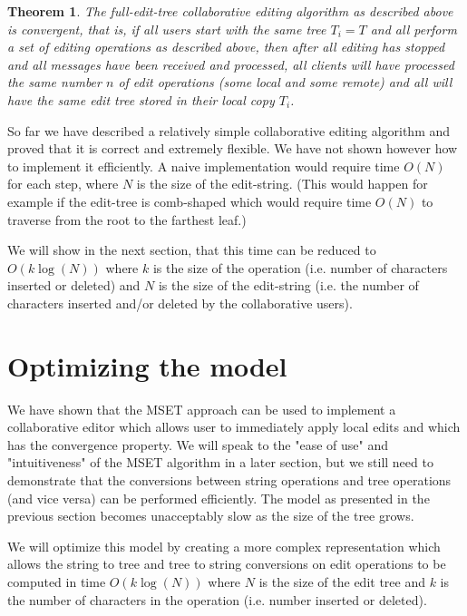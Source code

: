 \documentclass{amsart}
\newtheorem{theorem}{Theorem}[section]
\begin{document}
\begin{theorem}
The full-edit-tree collaborative editing algorithm as described above
is convergent, that is, if all users start with the same tree $T_i=T$ and
all perform a set of editing operations as described above, then after all
editing has stopped and all messages have been received and processed, all clients
will have processed the same number $n$ of edit operations (some local and
some remote) and all will have the same edit tree stored in their local copy
$T_i$.
\end{theorem}


So far we have described a relatively simple collaborative editing algorithm and
proved that it is correct and extremely flexible. We have not shown however how
to implement it efficiently. A naive implementation would require time $O(N)$ for
each step, where $N$ is the size of the edit-string. (This would happen
for example if the edit-tree is comb-shaped which would require time $O(N)$
to traverse from the root to the farthest leaf.)

We will show in the 
next section, that this time can be reduced to $O(k\log(N))$ where $k$ is the
size of the operation (i.e. number of characters inserted or deleted) and
$N$ is the size of the edit-string (i.e. the number of characters inserted
and/or deleted by the collaborative users).


\newpage
\section{Optimizing the model}

We have shown that the MSET approach can be used to implement a collaborative editor
which allows user to immediately apply local edits and which has the convergence
property.  We will speak to the "ease of use" and "intuitiveness" of the MSET algorithm
in a later section, but we still need to demonstrate that the conversions between
string operations and tree operations (and vice versa) can be performed efficiently.
The model as presented in the previous section becomes unacceptably slow as the
size of the tree grows.

We will optimize this model by creating a more complex representation which allows
the string to tree and tree to string conversions on edit operations to be computed
in time $O(k\log(N))$ where $N$ is the size of the edit tree and $k$ is the number
of characters in the operation (i.e. number inserted or deleted).
\end{document}
